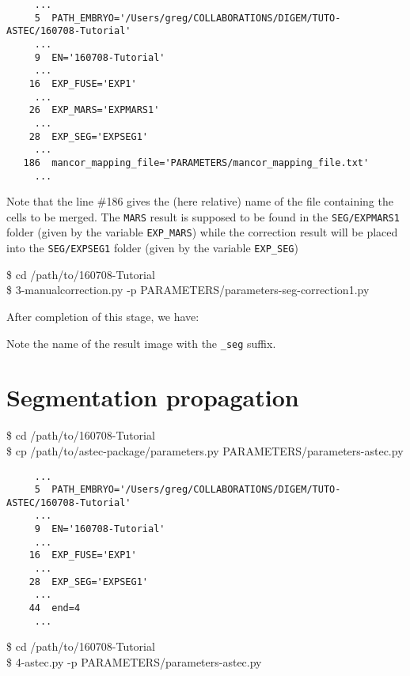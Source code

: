 \begin{verbatim}
     ...
     5	PATH_EMBRYO='/Users/greg/COLLABORATIONS/DIGEM/TUTO-ASTEC/160708-Tutorial'	
     ...
     9	EN='160708-Tutorial'			
     ... 
    16	EXP_FUSE='EXP1'	
     ...
    26	EXP_MARS='EXPMARS1'		
     ...
    28	EXP_SEG='EXPSEG1'
     ...
   186	mancor_mapping_file='PARAMETERS/mancor_mapping_file.txt' 
     ...
\end{verbatim}

Note that the line \#186 gives the (here relative) name of the file containing the cells to be merged. The \texttt{MARS} result is supposed to be found in the \texttt{SEG/EXPMARS1} folder (given by the variable \texttt{EXP\_MARS})  while the correction result will be placed into the \texttt{SEG/EXPSEG1} folder (given by the variable \texttt{EXP\_SEG})


\begin{code}{0.8}
\$ cd /path/to/160708-Tutorial\\
\$ 3-manualcorrection.py -p PARAMETERS/parameters-seg-correction1.py 
\end{code}

After completion of this stage, we have:

Note the name of the result image with the \texttt{\_seg} suffix.










\section{Segmentation propagation}


\begin{code}{0.8}
\$ cd /path/to/160708-Tutorial\\
\$ cp /path/to/astec-package/parameters.py PARAMETERS/parameters-astec.py\\
\end{code}



\begin{verbatim}
     ...
     5	PATH_EMBRYO='/Users/greg/COLLABORATIONS/DIGEM/TUTO-ASTEC/160708-Tutorial'	
     ...
     9	EN='160708-Tutorial'			
     ... 
    16	EXP_FUSE='EXP1'		
     ...
    28	EXP_SEG='EXPSEG1'
     ...
    44	end=4   
     ...
\end{verbatim}



\begin{code}{0.8}
\$ cd /path/to/160708-Tutorial\\
\$ 4-astec.py -p PARAMETERS/parameters-astec.py 
\end{code}







